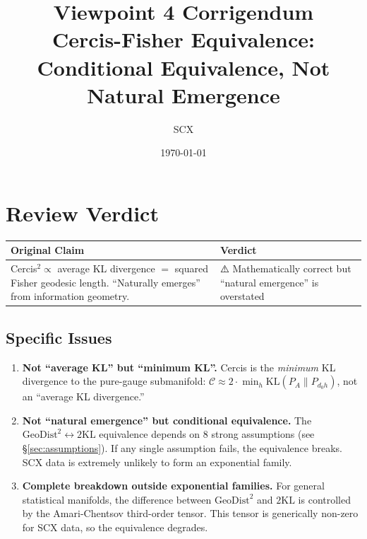 \documentclass{article}
\title{\textbf{Viewpoint 4 Corrigendum} \\
\large Cercis-Fisher Equivalence: Conditional Equivalence, Not Natural Emergence}
\author{SCX}
\date{\today}
\newcommand{\GeoDist}{\mathrm{GeoDist}}
\newcommand{\KL}{\mathrm{KL}}
\newcommand{\cercis}{\mathcal{C}}
\begin{document}
\maketitle

\section{Review Verdict}

\begin{center}
\begin{tabular}{|p{6cm}|p{8cm}|}
\hline
\textbf{Original Claim} & \textbf{Verdict} \\
\hline
Cercis${}^2 \propto$ average KL divergence $=$ squared Fisher geodesic length.
``Naturally emerges'' from information geometry.
& ⚠️ Mathematically correct but ``natural emergence'' is overstated \\
\hline
\end{tabular}
\end{center}

\subsection{Specific Issues}

\begin{enumerate}[label=(\arabic*)]
    \item \textbf{Not ``average KL'' but ``minimum KL''.}
    Cercis is the \emph{minimum} KL divergence to the pure-gauge submanifold:
    $\cercis \approx 2 \cdot \min_{h} \KL(P_A \| P_{d_0 h})$,
    not an ``average KL divergence.''

    \item \textbf{Not ``natural emergence'' but conditional equivalence.}
    The $\GeoDist^2 \leftrightarrow 2\KL$ equivalence depends on 8 strong assumptions (see \S\ref{sec:assumptions}).
    If any single assumption fails, the equivalence breaks. SCX data is extremely unlikely to form an exponential family.

    \item \textbf{Complete breakdown outside exponential families.}
    For general statistical manifolds, the difference between $\GeoDist^2$ and $2\KL$ is controlled
    by the Amari-Chentsov third-order tensor. This tensor is generically non-zero for SCX data,
    so the equivalence degrades.
\end{enumerate}
\end{document}
